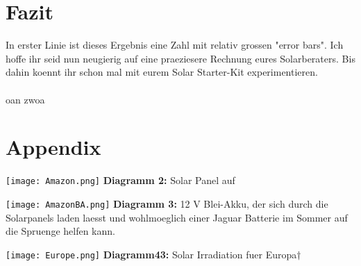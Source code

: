 \documentclass[11pt]{article} %
\begin{document}
\section{Fazit}

In erster Linie ist dieses Ergebnis eine Zahl mit relativ grossen "error bars". Ich hoffe ihr seid nun neugierig auf eine praeziesere Rechnung eures Solarberaters. Bis dahin koennt ihr schon mal mit eurem Solar Starter-Kit experimentieren. 
\\\\
\noindent oan zwoa

\theendnotes

\section{Appendix}
\texttt{[image: Amazon.png]}
\textbf{Diagramm 2:} Solar Panel auf \href{http://www.amazon.de/dp/B005I1999Y}{}

\texttt{[image: AmazonBA.png]}
\textbf{Diagramm 3:} 12 V Blei-Akku, der sich durch die Solarpanels laden laesst und wohlmoeglich einer Jaguar Batterie im Sommer auf die Spruenge helfen kann. 

\texttt{[image: Europe.png]}
\textbf{Diagramm43:} Solar Irradiation fuer Europa$\dagger$
\end{document}

